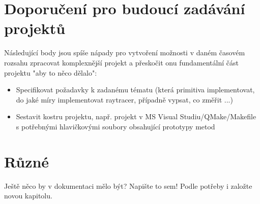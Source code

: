 \documentclass[11pt,a4paper]{article}
\begin{document}
\section{Doporučení pro budoucí zadávání projektů}

Následující body jsou spíše nápady pro vytvoření možnosti v daném časovém rozsahu zpracovat komplexnější projekt a přeskočit onu fundamentální část projektu "aby to něco dělalo":
\begin{itemize}
	\item Specifikovat požadavky k zadanému tématu (která primitiva implementovat, do jaké míry implementovat raytracer, případně vypsat, co změřit ...)
	\item Sestavit kostru projektu, např. projekt v MS Visual Studiu/QMake/Makefile s potřebnými hlavičkovými soubory obsahující prototypy metod
\end{itemize}

\section{Různé}

Ještě něco by v dokumentaci mělo být? Napište to sem! Podle potřeby i založte
novou kapitolu.



\nocite{pgr-raytracing}
\nocite{aurelius}
\nocite{pgp-optimalizace}
\nocite{cuda-doc}
\nocite{phong-wiki}
\nocite{so-stack}
\nocite{bvh}
\nocite{cmemory}
\nocite{trier}


\end{document}
